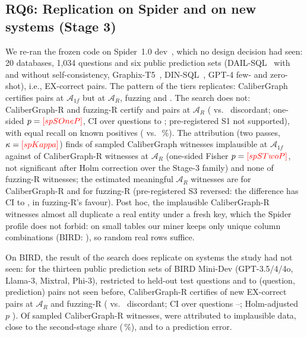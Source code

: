 \subsection{RQ6: Replication on Spider and on new systems (Stage 3)}\label{sec:replication}
We re-ran the frozen code on Spider~1.0 dev~\cite{yu2018spider}, which no design decision had seen: 20 databases, 1,034 questions and six public prediction sets (DAIL-SQL~\cite{gao2024dailsql} with and without self-consistency, Graphix-T5~\cite{li2023graphix}, DIN-SQL~\cite{pourreza2023dinsql}, GPT-4 few- and zero-shot), i.e.,  EX-correct pairs. The pattern of the tiers replicates: CaliberGraph certifies  pairs at $\mathcal A_{1f}$ but  at $\mathcal A_R$, fuzzing  and . The search does not: CaliberGraph-R and fuzzing-R certify  and  pairs at $\mathcal A_R$ ( vs.\  discordant; one-sided $p=\V{spSOneP}$, CI over questions  to ; pre-registered S1 not supported), with equal recall on known positives ( vs.\ \,\%). The attribution (two passes, $\kappa=\V{spKappa}$) finds  of  sampled CaliberGraph witnesses implausible at $\mathcal A_{1f}$ against  of  CaliberGraph-R witnesses at $\mathcal A_R$ (one-sided Fisher $p=\V{spSTwoP}$, not significant after Holm correction over the Stage-3 family) and none of  fuzzing-R witnesses; the estimated meaningful $\mathcal A_R$ witnesses are  for CaliberGraph-R and  for fuzzing-R (pre-registered S3 reversed: the difference has CI  to , in fuzzing-R's favour). Post hoc, the implausible CaliberGraph-R witnesses almost all duplicate a real entity under a fresh key, which the Spider profile does not forbid: on small tables our miner keeps only  unique column combinations (BIRD: ), so random real rows suffice.

On BIRD, the result of the search does replicate on systems the study had not seen: for the thirteen public prediction sets of BIRD Mini-Dev (GPT-3.5/4/4o, Llama-3, Mixtral, Phi-3), restricted to held-out test questions and to (question, prediction) pairs not seen before, CaliberGraph-R certifies  of  new EX-correct pairs at $\mathcal A_R$ and fuzzing-R  ( vs.\  discordant; CI over questions --; Holm-adjusted $p$ ). Of  sampled CaliberGraph-R witnesses,  were attributed to implausible data, close to the second-stage share (\,\%), and  to a prediction error.

